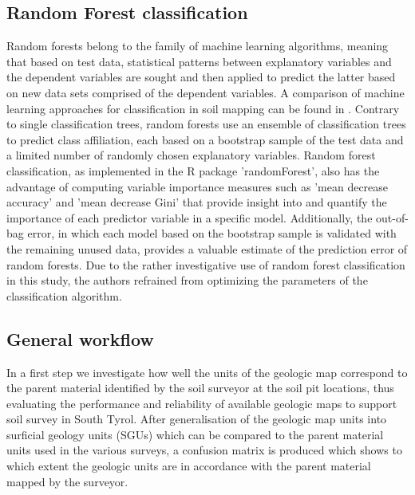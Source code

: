 \documentclass[preprint,12pt,authoryear]{elsarticle}
\begin{document}
\subsection{Random Forest classification }
Random forests \citep{Breiman2001} belong to the family of machine learning algorithms, meaning that based on test data, statistical patterns between explanatory variables and the dependent variables are sought and then applied to predict the latter based on new data sets comprised of the dependent variables. A comparison of machine learning approaches for classification in soil mapping can be found in \cite{Heung2016}. Contrary to single classification trees, random forests use an ensemble of classification trees to predict class affiliation, each based on a bootstrap sample of the test data and a limited number of randomly chosen explanatory variables. Random forest classification, as implemented in the R \citep{cran2014} package 'randomForest', also has the advantage of computing variable importance measures such as 'mean decrease accuracy' and 'mean decrease Gini' that provide insight into and quantify the importance of each predictor variable in a specific model.  Additionally, the out-of-bag error, in which each model based on the bootstrap sample is validated with the remaining unused data, provides a valuable estimate of the prediction error of random forests. Due to the rather investigative use of random forest classification in this study, the authors refrained from optimizing the parameters of the classification algorithm.

\subsection{General workflow}
In a first step we investigate how well the units of the  geologic map correspond to the parent material identified by the soil surveyor at the soil pit locations, thus evaluating the performance and reliability of available geologic maps to support soil survey in South Tyrol. After generalisation of the geologic map units into surficial geology units (SGUs) which can be compared to the parent material units used in the various surveys, a confusion matrix is produced which shows to which extent the geologic units are in accordance with the parent material mapped by the surveyor. 
\end{document}

